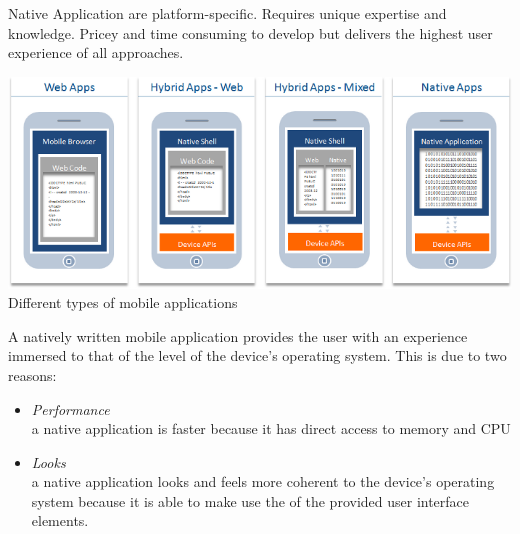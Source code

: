 Native Application are platform-specific. Requires unique expertise and knowledge. Pricey and time consuming to develop but
 delivers the highest user experience of all approaches.

\begin{centering}
\includegraphics[scale=0.5]{images/apptypesdefined.png}\\{Different types of mobile applications\cite{IBM-Worklight2012}}\\
\end{centering}

A natively written mobile application provides the user with an experience immersed to that of the level of the device's operating system. This is due to two reasons:
\begin{itemize}
\item
\emph{Performance}\\
a native application is faster because it has direct access to memory and CPU
\item \emph{Looks}\\
a native application looks and feels more coherent to the device's operating system because it is able to make use the of the provided user interface elements.
\end{itemize}